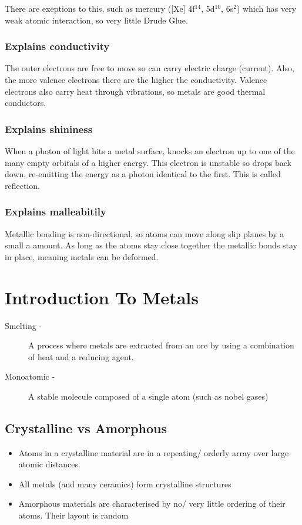 \documentclass[a4paper, 12pt]{article}
\begin{document}
				There are exeptions to this, such as mercury ([Xe] 4f$^{14}$, 5d$^{10}$, 6s$^2$) which has very weak atomic interaction, so very little Drude Glue.
				
			\subsubsection*{Explains conductivity}
				The outer electrons are free to move so can carry electric charge (current). Also, the more valence electrons there are the higher the conductivity. Valence electrons also carry heat through vibrations, so metals are good thermal conductors. 
				
			\subsubsection*{Explains shininess}
				When a photon of light hits a metal surface, knocks an electron up to one of the many empty orbitals of a higher energy. This electron is unstable so drops back down, re-emitting the energy as a photon identical to the first. This is called reflection. 
				
			\subsubsection*{Explains malleabitily}
				Metallic bonding is non-directional, so atoms can move along slip planes by a small a amount. As long as the atoms stay close together the metallic bonds stay in place, meaning metals can be deformed.
				
		
		\newpage
		
	\section{Introduction To Metals}
		\begin{description}
			\item[Smelting - ] A process where metals are extracted from an ore by using a combination of heat and a reducing agent. 
			\item[Monoatomic - ] A stable molecule composed of a single atom (such as nobel gases)
		\end{description}
		
		\subsection{Crystalline vs Amorphous}
		
			\begin{itemize}
				\item Atoms in a crystalline material are in a repeating/ orderly array over large atomic distances.
				\item All metals (and many ceramics) form crystalline structures
				\item Amorphous materials are characterised by no/ very little ordering of their atoms. Their layout is random
			\end{itemize}
			
\end{document}
